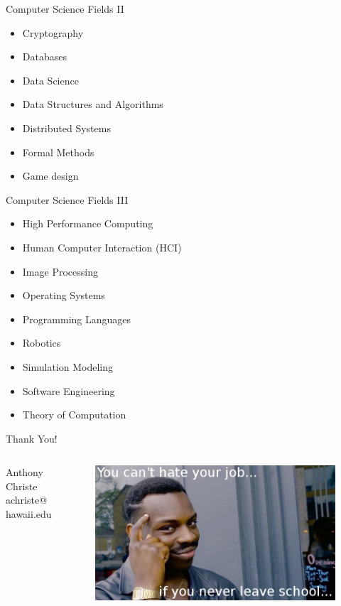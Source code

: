 \documentclass{beamer}
\begin{document}
\begin{frame}{Computer Science Fields II}
\begin{itemize}
	\item Cryptography
	\item Databases
	\item Data Science
	\item Data Structures and Algorithms
	\item Distributed Systems
	\item Formal Methods
	\item Game design
\end{itemize}
\end{frame}

\begin{frame}{Computer Science Fields III}
\begin{itemize}
	\item High Performance Computing
	\item Human Computer Interaction (HCI)
	\item Image Processing

	\item Operating Systems
	\item Programming Languages
	\item Robotics
	\item Simulation Modeling
	\item Software Engineering
	\item Theory of Computation
\end{itemize}
\end{frame}

\begin{frame}{Thank You!}
\begin{columns}
	\begin{column}{.35\textwidth}
		Anthony Christe \\
		achriste@hawaii.edu
	\end{column}
	\begin{column}{.65\textwidth}
		\begin{figure}
			\includegraphics[width=\linewidth]{img/meme.png}
		\end{figure}
	\end{column}
\end{columns}
\end{frame}
\end{document}
